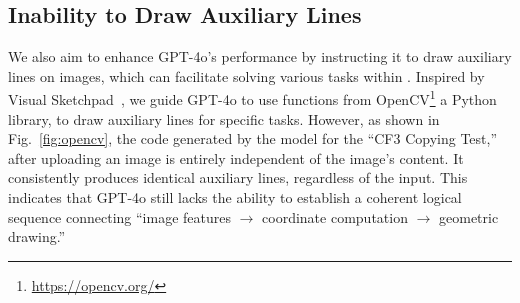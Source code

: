 \subsection{Inability to Draw Auxiliary Lines}

We also aim to enhance GPT-4o's performance by instructing it to draw auxiliary lines on images, which can facilitate solving various tasks within {\methodname}.
Inspired by Visual Sketchpad~\cite{hu2024visual}, we guide GPT-4o to use functions from OpenCV\footnote{\url{https://opencv.org/}} a Python library, to draw auxiliary lines for specific tasks.
However, as shown in Fig.~\ref{fig:opencv}, the code generated by the model for the ``CF3 Copying Test,'' after uploading an image is entirely independent of the image's content.
It consistently produces identical auxiliary lines, regardless of the input.
This indicates that GPT-4o still lacks the ability to establish a coherent logical sequence connecting ``image features $\to$ coordinate computation $\to$ geometric drawing.''